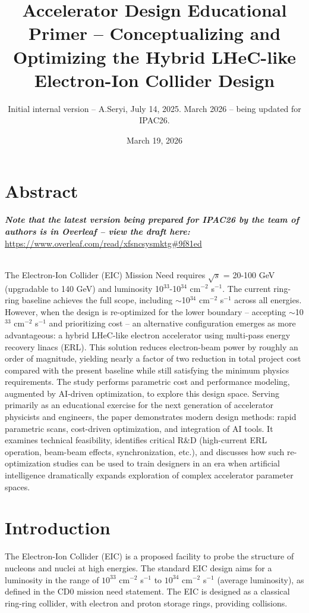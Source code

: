 \documentclass{article}
\title{Accelerator Design Educational Primer -- Conceptualizing and Optimizing the Hybrid LHeC-like Electron-Ion Collider Design}
\author{Initial internal version -- A.Seryi, July 14, 2025. March 2026 -- being updated for IPAC26.}
\date{March 19, 2026}
\begin{document}
\maketitle

\section{Abstract}

{\it \bf Note that the latest version being prepared for IPAC26 by the team of authors is in Overleaf -- view the draft here:} \url{https://www.overleaf.com/read/xfsncsysmktg#9f81ed}

~\\

The Electron-Ion Collider (EIC) Mission Need requires $\sqrt{s}$ = 20-100 GeV (upgradable to 140 GeV) and luminosity 10$^{33}$-10$^{34}$ cm$^{-2}$ s$^{-1}$. The current ring-ring baseline achieves the full scope, including $\sim$10$^{34}$ cm$^{-2}$ s$^{-1}$ across all energies. However, when the design is re-optimized for the lower boundary -- accepting $\sim$10$^{33}$ cm$^{-2}$ s$^{-1}$ and prioritizing cost -- an alternative configuration emerges as more advantageous: a hybrid LHeC-like electron accelerator using multi-pass energy recovery linacs (ERL).
This solution reduces electron-beam power by roughly an order of magnitude, yielding nearly a factor of two reduction in total project cost compared with the present baseline while still satisfying the minimum physics requirements. The study performs parametric cost and performance modeling, augmented by AI-driven optimization, to explore this design space.
Serving primarily as an educational exercise for the next generation of accelerator physicists and engineers, the paper demonstrates modern design methods: rapid parametric scans, cost-driven optimization, and integration of AI tools. It examines technical feasibility, identifies critical R\&D (high-current ERL operation, beam-beam effects, synchronization, etc.), and discusses how such re-optimization studies can be used to train designers in an era when artificial intelligence dramatically expands exploration of complex accelerator parameter spaces.


\section{Introduction}

The Electron-Ion Collider (EIC) is a proposed facility to probe the structure of nucleons and nuclei at high energies. The standard EIC design aims for a luminosity in the range of $10^{33}$ cm$^{-2}$ s$^{-1}$ to $10^{34}$ cm$^{-2}$ s$^{-1}$ (average luminosity), as defined in the CD0 mission need statement. The EIC is designed as a classical ring-ring collider, with electron and proton storage rings, providing collisions. 
\end{document}
